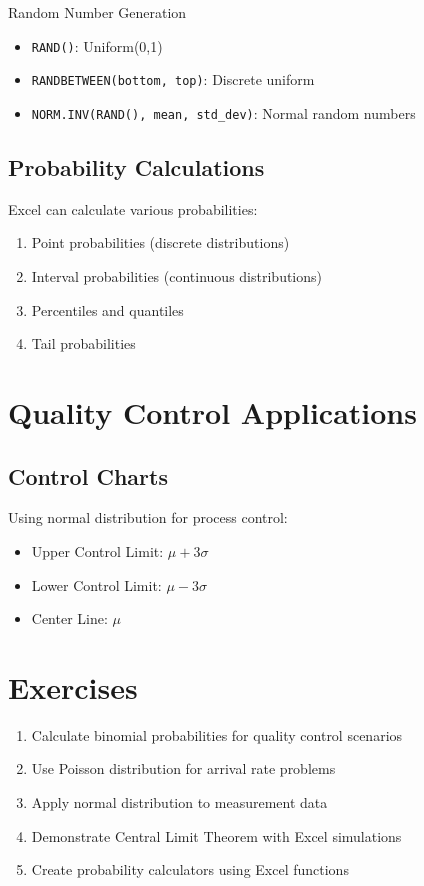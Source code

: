 \documentclass[12pt,a4paper]{book}
\begin{document}
\begin{example}{Random Number Generation}
\begin{itemize}
    \item \texttt{RAND()}: Uniform(0,1)
    \item \texttt{RANDBETWEEN(bottom, top)}: Discrete uniform
    \item \texttt{NORM.INV(RAND(), mean, std\_dev)}: Normal random numbers
\end{itemize}
\end{example}

\subsection{Probability Calculations}

Excel can calculate various probabilities:
\begin{enumerate}
    \item Point probabilities (discrete distributions)
    \item Interval probabilities (continuous distributions)
    \item Percentiles and quantiles
    \item Tail probabilities
\end{enumerate}

\section{Quality Control Applications}

\subsection{Control Charts}

Using normal distribution for process control:
\begin{itemize}
    \item Upper Control Limit: $\mu + 3\sigma$
    \item Lower Control Limit: $\mu - 3\sigma$
    \item Center Line: $\mu$
\end{itemize}

\section{Exercises}

\begin{enumerate}
    \item Calculate binomial probabilities for quality control scenarios
    \item Use Poisson distribution for arrival rate problems
    \item Apply normal distribution to measurement data
    \item Demonstrate Central Limit Theorem with Excel simulations
    \item Create probability calculators using Excel functions
\end{enumerate}
\end{document}
